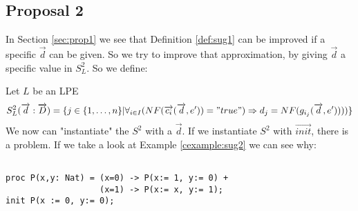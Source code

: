 \documentclass[a4paper,10pt]{article}
\theoremstyle{plain}
\theoremstyle{definition}
\newcommand{\ovr}{\overrightarrow}
\begin{document}
\subsection{Proposal 2}
In Section \ref{sec:prop1} we see that Definition \ref{def:sug1} can be improved if a specific $\ovr{d}$ can be given. So we try to improve that approximation, by giving $\ovr{d}$ a specific value in $S_L^2$. So we define: 

\begin{defn} Let $L$ be an LPE\label{def:sug2} 
\begin{displaymath}
S_L^2(\ovr{d}:\ovr{D})=
\lbrace   
j \in \lbrace 1, \ldots , n \rbrace \vert \forall_{i\in I} (NF(\ovr{c_i}(\ovr{d},e')) = "true") \Rightarrow d_j = NF(g_{i_j}(\ovr{d},e'))))\rbrace
\end{displaymath}
We now can "instantiate" the $S^2$ with a $\ovr{d}$. If we instantiate $S^2$ with $\ovr{init}$, there is a problem. If we take a look at Example \ref{cexample:sug2} we can see why:
\begin{example} [Let $E2$ be]\label{cexample:sug2}\begin{verbatim} 
 
proc P(x,y: Nat) = (x=0) -> P(x:= 1, y:= 0) +
                   (x=1) -> P(x:= x, y:= 1);
init P(x := 0, y:= 0);


\end{verbatim}
\end{example}
\end{defn}
\end{document}
